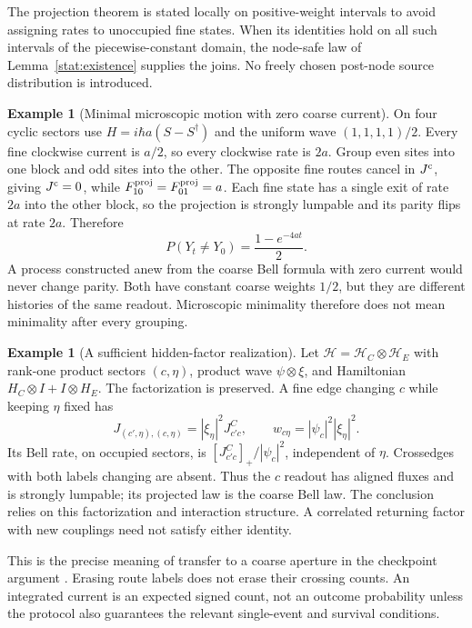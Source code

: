 \documentclass[11pt,oneside,openany]{book}
\theoremstyle{definition}
\newtheorem{example}[theorem]{Example}
\theoremstyle{remark}\newtheorem{remark}[theorem]{Remark}
\begin{document}
The projection theorem is stated locally on positive-weight intervals to
avoid assigning rates to unoccupied fine states. When its identities hold
on all such intervals of the piecewise-constant domain, the node-safe law
of Lemma~\ref{stat:existence} supplies the joins. No freely chosen
post-node source distribution is introduced.

\begin{example}[Minimal microscopic motion with zero coarse current]
\label{stat:parity}
On four cyclic sectors use
$H=i\hbar a(S-S^\dagger)$ and the uniform wave
$(1,1,1,1)/2$. Every fine clockwise current is $a/2$, so every clockwise
rate is $2a$. Group even sites into one block and odd sites into the other.
The opposite fine routes cancel in $J^{\rm c}$, giving $J^{\rm c}=0$, while
$F^{\rm proj}_{10}=F^{\rm proj}_{01}=a$. Each fine state has a single exit
of rate $2a$ into the other block, so the projection is strongly lumpable
and its parity flips at rate $2a$. Therefore
\[
 P(Y_t\ne Y_0)=\frac{1-e^{-4at}}2.
\]
A process constructed anew from the coarse Bell formula with zero current
would never change parity. Both have constant coarse weights $1/2$, but
they are different histories of the same readout. Microscopic minimality
therefore does not mean minimality after every grouping.
\end{example}

\begin{example}[A sufficient hidden-factor realization]\label{stat:factor}
Let $\mathcal H=\mathcal H_C\otimes\mathcal H_E$ with rank-one product
sectors $(c,\eta)$, product wave $\psi\otimes\xi$, and Hamiltonian
$H_C\otimes I+I\otimes H_E$. The factorization is preserved. A fine edge
changing $c$ while keeping $\eta$ fixed has
\[
 J_{(c',\eta),(c,\eta)}=|\xi_\eta|^2J^C_{c'c},\qquad
 w_{c\eta}=|\psi_c|^2|\xi_\eta|^2.
\]
Its Bell rate, on occupied sectors, is $[J^C_{c'c}]_+/|\psi_c|^2$,
independent of $\eta$. Crossedges with both labels changing are absent.
Thus the $c$ readout has aligned fluxes and is strongly lumpable; its
projected law is the coarse Bell law. The conclusion relies on this
factorization and interaction structure. A correlated returning factor
with new couplings need not satisfy either identity.
\end{example}

This is the precise meaning of transfer to a coarse aperture in the
checkpoint argument \cite{C03}. Erasing route labels does not erase their
crossing counts. An integrated current is an expected signed count, not
an outcome probability unless the protocol also guarantees the relevant
single-event and survival conditions.
\end{document}
